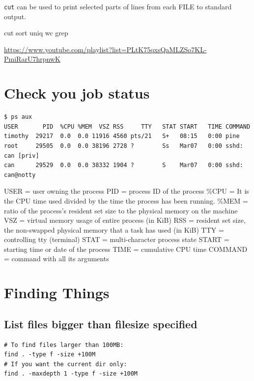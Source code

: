 \documentclass[]{book}
\begin{document}
\texttt{cut} can be used to print selected parts of lines from each FILE to standard output.

cut sort uniq wc grep

\url{https://www.youtube.com/playlist?list=PLtK75qxsQaMLZSo7KL-PmiRarU7hrpnwK}

\hypertarget{check-you-job-status}{%
\section{Check you job status}\label{check-you-job-status}}

\begin{verbatim}
$ ps aux  
USER       PID  %CPU %MEM  VSZ RSS     TTY   STAT START   TIME COMMAND
timothy  29217  0.0  0.0 11916 4560 pts/21   S+   08:15   0:00 pine  
root     29505  0.0  0.0 38196 2728 ?        Ss   Mar07   0:00 sshd: can [priv]   
can      29529  0.0  0.0 38332 1904 ?        S    Mar07   0:00 sshd: can@notty  
\end{verbatim}

USER = user owning the process
PID = process ID of the process
\%CPU = It is the CPU time used divided by the time the process has been running.
\%MEM = ratio of the process's resident set size to the physical memory on the machine
VSZ = virtual memory usage of entire process (in KiB)
RSS = resident set size, the non-swapped physical memory that a task has used (in KiB)
TTY = controlling tty (terminal)
STAT = multi-character process state
START = starting time or date of the process
TIME = cumulative CPU time
COMMAND = command with all its arguments

\hypertarget{finding-things}{%
\section{Finding Things}\label{finding-things}}

\hypertarget{list-files-bigger-than-filesize-specified}{%
\subsection{List files bigger than filesize specified}\label{list-files-bigger-than-filesize-specified}}

\begin{verbatim}
# To find files larger than 100MB:
find . -type f -size +100M
# If you want the current dir only:
find . -maxdepth 1 -type f -size +100M
\end{verbatim}
\end{document}
